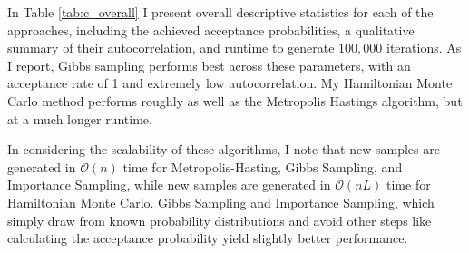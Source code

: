 \documentclass{article}
\begin{document}
In Table \ref{tab:c_overall} I present overall descriptive statistics for each of the approaches, including the achieved acceptance probabilities, a qualitative summary of their autocorrelation, and runtime to generate $100,000$ iterations. As I report, Gibbs sampling performs best across these parameters, with an acceptance rate of 1 and extremely low autocorrelation. My Hamiltonian Monte Carlo method performs roughly as well as the Metropolis Hastings algorithm, but at a much longer runtime.

In considering the scalability of these algorithms, I note that new samples are generated in $\mathcal{O}(n)$ time for Metropolis-Hasting, Gibbs Sampling, and Importance Sampling, while new samples are generated in $\mathcal{O}(nL)$ time for Hamiltonian Monte Carlo. Gibbs Sampling and Importance Sampling, which simply draw from known probability distributions and avoid other steps like calculating the acceptance probability yield slightly better performance. 
\end{document}
